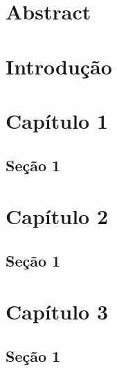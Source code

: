\documentclass[12pt, a4paper]{report}
\begin{document}
\newpage
\chapter*{Abstract}
\thispagestyle{empty}


\newpage
\tableofcontents
\thispagestyle{empty}


\chapter*{Introdução}
\pagestyle{myheadings}
\setcounter{page}{1}



\chapter{Capítulo 1}


\section{Seção 1}



\chapter{Capítulo 2}


\section{Seção 1}


\chapter{Capítulo 3}


\section{Seção 1}




\nocite{Lucas1, Lucas2, Bonola}


\newpage
\renewcommand{\refname}{Referências Bibliográficas}

\end{document}
